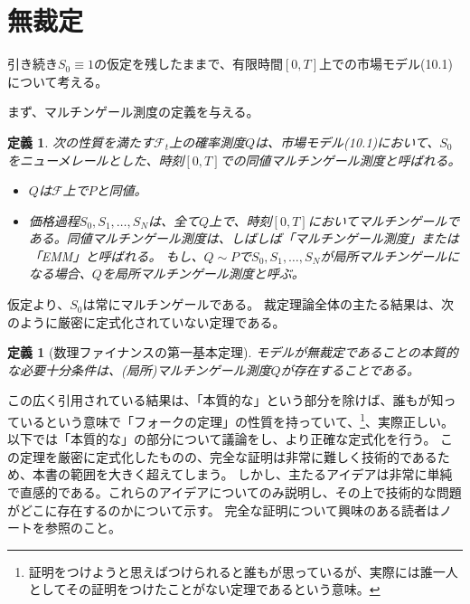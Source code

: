 \documentclass{jsbook}
\theoremstyle{withoutdotendstyle}
\newtheorem{definition}[theorem]{定義}
\numberwithin{theorem}{chapter}%
\begin{document}
\section{無裁定}
引き続き$S_{0}\equiv 1$の仮定を残したままで、有限時間$\left[0, T\right]$上での市場モデル(10.1)について考える。

まず、マルチンゲール測度の定義を与える。
\begin{definition}
  次の性質を満たす$\mathcal{F}_{t}$上の確率測度$Q$は、市場モデル(10.1)において、$S_{0}$をニューメレールとした、時刻$\left[0, T\right]$での同値マルチンゲール測度と呼ばれる。
  \begin{itemize}
    \item $Q$は$\mathcal{F}$上で$P$と同値。
    \item 価格過程$S_{0}, S_{1}, \dots ,S_{N}$は、全て$Q$上で、時刻$\left[0, T\right]$においてマルチンゲールである。同値マルチンゲール測度は、しばしば「マルチンゲール測度」または「EMM」と呼ばれる。
    もし、$Q\sim P$で$S_{0}, S_{1}, \dots , S_{N}$が局所マルチンゲールになる場合、$Q$を局所マルチンゲール測度と呼ぶ。
  \end{itemize}
\end{definition}
仮定より、$S_{0}$は常にマルチンゲールである。
裁定理論全体の主たる結果は、次のように厳密に定式化されていない定理である。

\begin{definition}[数理ファイナンスの第一基本定理]
モデルが無裁定であることの本質的な必要十分条件は、(局所)マルチンゲール測度$Q$が存在することである。
\end{definition}
この広く引用されている結果は、「本質的な」という部分を除けば、誰もが知っているという意味で「フォークの定理」の性質を持っていて、\footnote{証明をつけようと思えばつけられると誰もが思っているが、実際には誰一人としてその証明をつけたことがない定理であるという意味。}、実際正しい。
以下では「本質的な」の部分について議論をし、より正確な定式化を行う。
この定理を厳密に定式化したものの、完全な証明は非常に難しく技術的であるため、本書の範囲を大きく超えてしまう。
しかし、主たるアイデアは非常に単純で直感的である。これらのアイデアについてのみ説明し、その上で技術的な問題がどこに存在するのかについて示す。
完全な証明について興味のある読者はノートを参照のこと。
\end{document}
